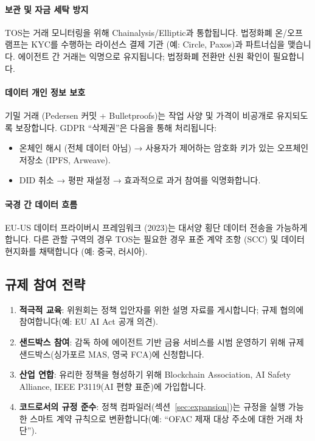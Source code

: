 \documentclass[11pt]{article}
\begin{document}
\paragraph{보관 및 자금 세탁 방지}
TOS는 거래 모니터링을 위해 Chainalysis/Elliptic과 통합됩니다. 법정화폐 온/오프 램프는 KYC를 수행하는 라이선스 결제 기관 (예: Circle, Paxos)과 파트너십을 맺습니다. 에이전트 간 거래는 익명으로 유지됩니다; 법정화폐 전환만 신원 확인이 필요합니다.

\paragraph{데이터 개인 정보 보호}
기밀 거래 (Pedersen 커밋 + Bulletproofs)는 작업 사양 및 가격이 비공개로 유지되도록 보장합니다. GDPR ``삭제권''은 다음을 통해 처리됩니다:
\begin{itemize}[noitemsep]
  \item 온체인 해시 (전체 데이터 아님) → 사용자가 제어하는 암호화 키가 있는 오프체인 저장소 (IPFS, Arweave).
  \item DID 취소 → 평판 재설정 → 효과적으로 과거 참여를 익명화합니다.
\end{itemize}

\paragraph{국경 간 데이터 흐름}
EU-US 데이터 프라이버시 프레임워크 (2023)는 대서양 횡단 데이터 전송을 가능하게 합니다. 다른 관할 구역의 경우 TOS는 필요한 경우 표준 계약 조항 (SCC) 및 데이터 현지화를 채택합니다 (예: 중국, 러시아).

\subsection{규제 참여 전략}

\begin{enumerate}[noitemsep]
  \item \textbf{적극적 교육}: 위원회는 정책 입안자를 위한 설명 자료를 게시합니다; 규제 협의에 참여합니다(예: EU AI Act 공개 의견).
  \item \textbf{샌드박스 참여}: 감독 하에 에이전트 기반 금융 서비스를 시범 운영하기 위해 규제 샌드박스(싱가포르 MAS, 영국 FCA)에 신청합니다.
  \item \textbf{산업 연합}: 유리한 정책을 형성하기 위해 Blockchain Association, AI Safety Alliance, IEEE P3119(AI 편향 표준)에 가입합니다.
  \item \textbf{코드로서의 규정 준수}: 정책 컴파일러(섹션~\ref{sec:expansion})는 규정을 실행 가능한 스마트 계약 규칙으로 변환합니다(예: ``OFAC 제재 대상 주소에 대한 거래 차단'').
\end{enumerate}
\end{document}
